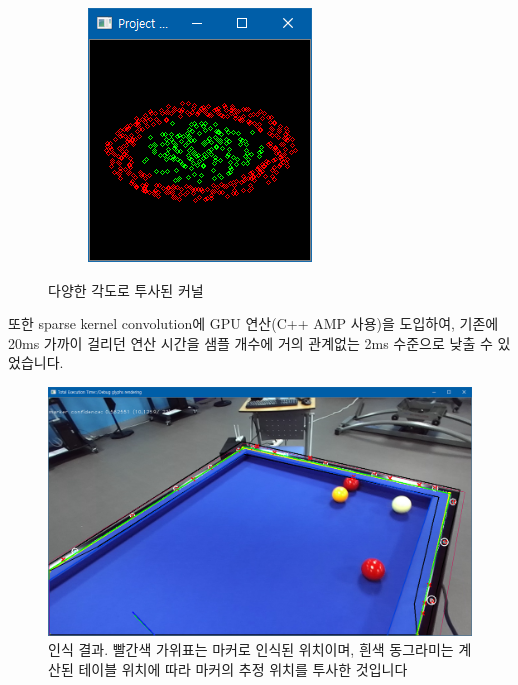 \documentclass[10pt]{oblivoir}
\begin{document}
\begin{figure}[ht]
\begin{subfigure}{0.3\textwidth}
    \end{subfigure}
    \begin{subfigure}{0.3\textwidth}
        \includegraphics[width=\textwidth]{img/kernel-project-2.png}
    \end{subfigure}
    \caption{다양한 각도로 투사된 커널}
\end{figure}

또한 sparse kernel convolution에 GPU 연산(C++ AMP 사용)을 도입하여, 기존에 20ms 가까이 걸리던 연산 시간을 샘플 개수에 거의 관계없는 2ms 수준으로 낮출 수 있었습니다.

\begin{figure}[ht]
    \centering
    \includegraphics[width=\textwidth]{img/result.png}
    \caption{인식 결과. 빨간색 가위표는 마커로 인식된 위치이며, 흰색 동그라미는 계산된 테이블 위치에 따라 마커의 추정 위치를 투사한 것입니다}
    \label{fig;result}
\end{figure}
\end{document}
